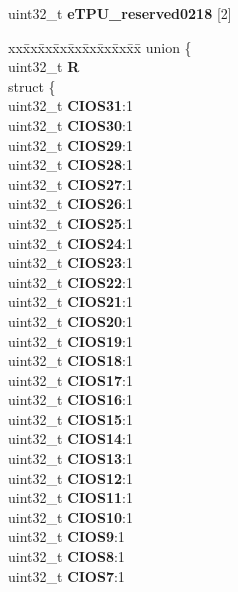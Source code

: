 \begin{DoxyCompactItemize}
\begin{tabbing}
\end{tabbing}\item 
\mbox{\label{structETPU__tag_a65ef0f04f71e6962ed6834bfac38b66c}} 
uint32\+\_\+t {\bfseries e\+T\+P\+U\+\_\+reserved0218} \mbox{[}2\mbox{]}
\item 
\mbox{\label{structETPU__tag_a01e73f698860bfc331c19452a3f6ae7c}} 
\begin{tabbing}
xx\=xx\=xx\=xx\=xx\=xx\=xx\=xx\=xx\=\kill
union \{\\
\>uint32\_t {\bfseries R}\\
\>struct \{\\
\>\>uint32\_t {\bfseries CIOS31}:1\\
\>\>uint32\_t {\bfseries CIOS30}:1\\
\>\>uint32\_t {\bfseries CIOS29}:1\\
\>\>uint32\_t {\bfseries CIOS28}:1\\
\>\>uint32\_t {\bfseries CIOS27}:1\\
\>\>uint32\_t {\bfseries CIOS26}:1\\
\>\>uint32\_t {\bfseries CIOS25}:1\\
\>\>uint32\_t {\bfseries CIOS24}:1\\
\>\>uint32\_t {\bfseries CIOS23}:1\\
\>\>uint32\_t {\bfseries CIOS22}:1\\
\>\>uint32\_t {\bfseries CIOS21}:1\\
\>\>uint32\_t {\bfseries CIOS20}:1\\
\>\>uint32\_t {\bfseries CIOS19}:1\\
\>\>uint32\_t {\bfseries CIOS18}:1\\
\>\>uint32\_t {\bfseries CIOS17}:1\\
\>\>uint32\_t {\bfseries CIOS16}:1\\
\>\>uint32\_t {\bfseries CIOS15}:1\\
\>\>uint32\_t {\bfseries CIOS14}:1\\
\>\>uint32\_t {\bfseries CIOS13}:1\\
\>\>uint32\_t {\bfseries CIOS12}:1\\
\>\>uint32\_t {\bfseries CIOS11}:1\\
\>\>uint32\_t {\bfseries CIOS10}:1\\
\>\>uint32\_t {\bfseries CIOS9}:1\\
\>\>uint32\_t {\bfseries CIOS8}:1\\
\>\>uint32\_t {\bfseries CIOS7}:1\\

\end{tabbing}
\end{DoxyCompactItemize}
